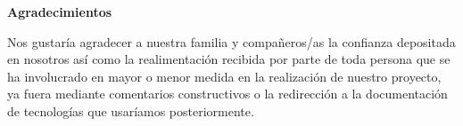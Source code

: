 
\newpage
\begin{center}
{\bf \Huge Agradecimientos}
\end{center}
\vspace{1cm}
\setlength{\baselineskip}{0.8cm}



Nos gustaría agradecer a nuestra familia y compañeros/as la confianza depositada en nosotros así como la realimentación
recibida por parte de toda persona que se ha involucrado en mayor o menor medida en la realización de nuestro proyecto, ya 
fuera mediante comentarios constructivos o la redirección a la documentación de tecnologías que usaríamos posteriormente.
